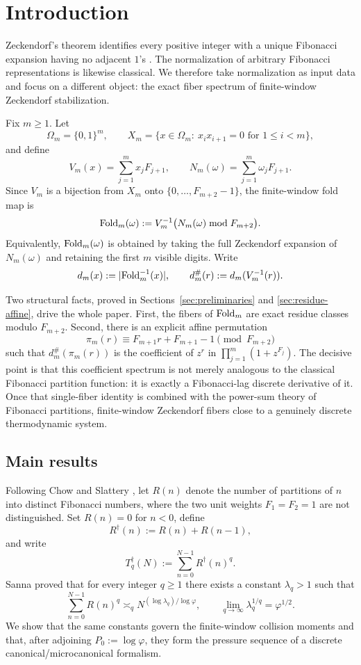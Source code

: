 \section{Introduction}\label{sec:introduction}

Zeckendorf's theorem identifies every positive integer with a unique Fibonacci
expansion having no adjacent \(1\)'s \cite{Lekkerkerker1952,Zeckendorf1972}.
The normalization of arbitrary Fibonacci representations is likewise classical.
We therefore take normalization as input data and focus on a different object:
the exact fiber spectrum of finite-window Zeckendorf stabilization.

Fix \(m\ge 1\).  Let
\[
  \Omega_m=\{0,1\}^m,
  \qquad
  X_m=\{x\in\Omega_m:\ x_ix_{i+1}=0\text{ for }1\le i<m\},
\]
and define
\[
  V_m(x)=\sum_{j=1}^m x_jF_{j+1},
  \qquad
  N_m(\omega)=\sum_{j=1}^m \omega_jF_{j+1}.
\]
Since \(V_m\) is a bijection from \(X_m\) onto \(\{0,\dots,F_{m+2}-1\}\), the
finite-window fold map is
\[
  \mathrm{Fold}_m(\omega):=V_m^{-1}\bigl(N_m(\omega)\bmod F_{m+2}\bigr).
\]
Equivalently, \(\mathrm{Fold}_m(\omega)\) is obtained by taking the full Zeckendorf
expansion of \(N_m(\omega)\) and retaining the first \(m\) visible digits.
Write
\[
  d_m(x):=\lvert \mathrm{Fold}_m^{-1}(x) \rvert,
  \qquad
  d_m^\#(r):=d_m(V_m^{-1}(r)).
\]

Two structural facts, proved in Sections~\ref{sec:preliminaries} and
\ref{sec:residue-affine}, drive the whole paper.  First, the fibers of
\(\mathrm{Fold}_m\) are exact residue classes modulo \(F_{m+2}\).  Second, there is an
explicit affine permutation
\[
  \pi_m(r)\equiv F_{m+1}r+F_{m+1}-1 \pmod{F_{m+2}}
\]
such that \(d_m^\#(\pi_m(r))\) is the coefficient of \(z^r\) in
\(\prod_{j=1}^m(1+z^{F_j})\).  The decisive point is that this coefficient
spectrum is not merely analogous to the classical Fibonacci partition function:
it is exactly a Fibonacci-lag discrete derivative of it.  Once that
single-fiber identity is combined with the power-sum theory of Fibonacci
partitions, finite-window Zeckendorf fibers close to a genuinely discrete
thermodynamic system.

\subsection{Main results}

Following Chow and Slattery \cite{ChowSlattery2021}, let \(R(n)\) denote the
number of partitions of \(n\) into distinct Fibonacci numbers, where the two
unit weights \(F_1=F_2=1\) are not distinguished.  Set \(R(n)=0\) for \(n<0\),
define
\[
  R^\dagger(n):=R(n)+R(n-1),
\]
and write
\[
  T_q^\dagger(N):=\sum_{n=0}^{N-1} R^\dagger(n)^q.
\]
Sanna \cite{Sanna2025} proved that for every integer \(q\ge 1\) there exists a
constant \(\lambda_q>1\) such that
\[
  \sum_{n=0}^{N-1} R(n)^q \asymp_q N^{(\log \lambda_q)/\log\varphi},
  \qquad
  \lim_{q\to\infty}\lambda_q^{1/q}=\varphi^{1/2}.
\]
We show that the same constants govern the finite-window collision moments and
that, after adjoining \(P_0:=\log\varphi\), they form the pressure sequence of a
discrete canonical/microcanonical formalism.

